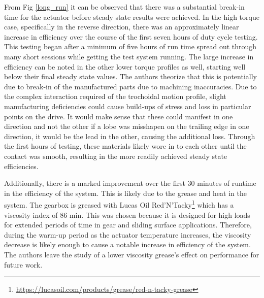 From Fig \ref{long_run} it can be observed that there was a substantial break-in time for the actuator before steady state results were achieved.
In the high torque case, specifically in the reverse direction, there was an approximately linear increase in efficiency over the course of the first seven hours of duty cycle testing.
This testing began after a minimum of five hours of run time spread out through many short sessions while getting the test system running.
The large increase in efficiency can be noted in the other lower torque profiles as well, starting well below their final steady state values.
The authors theorize that this is potentially due to break-in of the manufactured parts due to machining inaccuracies.
Due to the complex interaction required of the trochoidal motion profile, slight manufacturing deficiencies could cause build-ups of stress and loss in particular points on the drive.
It would make sense that these could manifest in one direction and not the other if a lobe was misshapen on the trailing edge in one direction, it would be the lead in the other, causing the additional loss.
Through the first hours of testing, these materials likely wore in to each other until the contact was smooth, resulting in the more readily achieved steady state efficiencies.

Additionally, there is a marked improvement over the first 30 minutes of runtime in the efficiency of the system.
This is likely due to the grease and heat in the system.
The gearbox is greased with Lucas Oil Red'N'Tacky\footnote{\url{https://lucasoil.com/products/grease/red-n-tacky-grease}} which has a viscosity index of 86 min.
This was chosen because it is designed for high loads for extended periods of time in gear and sliding surface applications.
Therefore, during the warm-up period as the actuator temperature increases, the viscosity decrease is likely enough to cause a notable increase in efficiency of the system.
The authors leave the study of a lower viscosity grease's effect on performance for future work.

